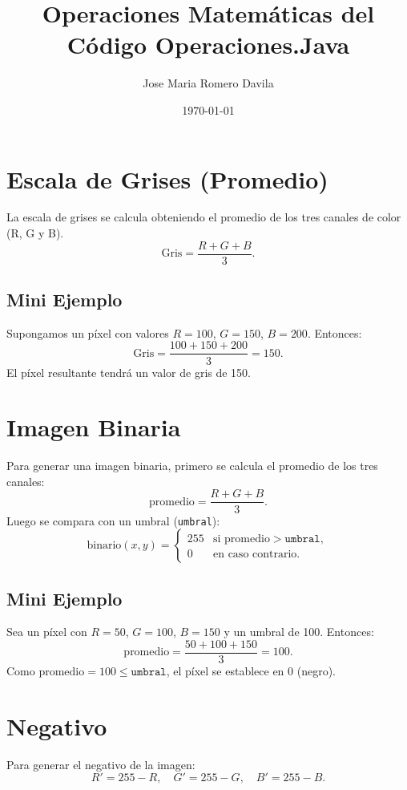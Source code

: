 \documentclass[11pt]{article}
\begin{document}
\title{Operaciones Matemáticas del Código Operaciones.Java}
\author{Jose Maria Romero Davila}
\date{\today}
\maketitle

\section{Escala de Grises (Promedio)}

La escala de grises se calcula obteniendo el promedio de los tres canales de color (R, G y B). 
\[
\text{Gris} = \frac{R + G + B}{3}.
\]

\subsection{Mini Ejemplo}
Supongamos un píxel con valores \(R = 100\), \(G = 150\), \(B = 200\). Entonces:
\[
\text{Gris} = \frac{100 + 150 + 200}{3} = 150.
\]
El píxel resultante tendrá un valor de gris de 150.

\section{Imagen Binaria}

Para generar una imagen binaria, primero se calcula el promedio de los tres canales:
\[
\text{promedio} = \frac{R + G + B}{3}.
\]
Luego se compara con un umbral (\texttt{umbral}):
\[
\text{binario}(x, y) = 
\begin{cases}
255 & \text{si } \text{promedio} > \texttt{umbral},\\
0   & \text{en caso contrario}.
\end{cases}
\]

\subsection{Mini Ejemplo}
Sea un píxel con \(R = 50\), \(G = 100\), \(B = 150\) y un umbral de 100. Entonces:
\[
\text{promedio} = \frac{50 + 100 + 150}{3} = 100.
\]
Como \(\text{promedio} = 100 \leq \texttt{umbral}\), el píxel se establece en 0 (negro).

\section{Negativo}
Para generar el negativo de la imagen:
\[
R' = 255 - R, 
\quad G' = 255 - G, 
\quad B' = 255 - B.
\]
\end{document}
